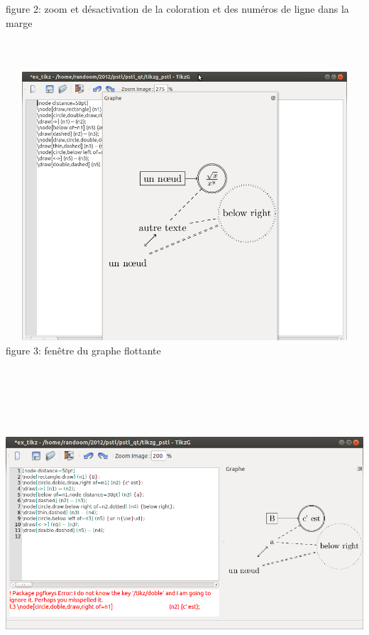 \documentclass[a4paper]{report}
\begin{document}
figure 2: zoom et désactivation de la coloration et des numéros de ligne dans la marge
\newline
\\
\\
\\
\\
  \includegraphics[width=15cm, height=10cm]{img/r_42.png} 
\\
figure 3: fenêtre du graphe flottante
\newline
\\
\\
\\
\\
  \includegraphics[width=15cm, height=10cm]{img/r_2.png} 
\\
\end{document}
